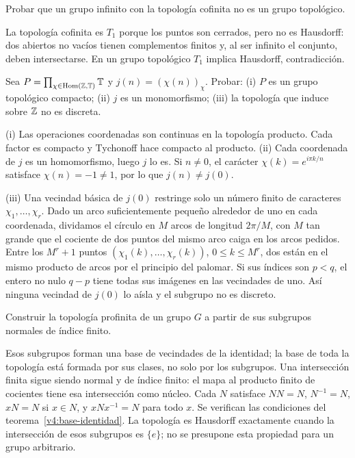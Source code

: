 \begin{ejercicio}\label{ej:v4-l15-2}
Probar que un grupo infinito con la topología cofinita no es un grupo topológico.
\end{ejercicio}
\begin{solucion}
La topología cofinita es $T_1$ porque los puntos son cerrados, pero no es Hausdorff: dos abiertos no vacíos tienen complementos finitos y, al ser infinito el conjunto, deben intersectarse. En un grupo topológico $T_1$ implica Hausdorff, contradicción.
\end{solucion}

\begin{ejercicio}\label{ej:v4-l15-3}
Sea $P=\prod_{\chi\in\operatorname{Hom}(\mathbb Z,\mathbb T)}\mathbb T$ y $j(n)=(\chi(n))_\chi$. Probar: (i) $P$ es un grupo topológico compacto; (ii) $j$ es un monomorfismo; (iii) la topología que induce sobre $\mathbb Z$ no es discreta.
\end{ejercicio}
\begin{solucion}
(i) Las operaciones coordenadas son continuas en la topología producto. Cada factor es compacto y Tychonoff hace compacto al producto. (ii) Cada coordenada de $j$ es un homomorfismo, luego $j$ lo es. Si $n\ne0$, el carácter $\chi(k)=e^{i\pi k/n}$ satisface $\chi(n)=-1\ne1$, por lo que $j(n)\ne j(0)$.

(iii) Una vecindad básica de $j(0)$ restringe solo un número finito de caracteres $\chi_1,\ldots,\chi_r$. Dado un arco suficientemente pequeño alrededor de uno en cada coordenada, dividamos el círculo en $M$ arcos de longitud $2\pi/M$, con $M$ tan grande que el cociente de dos puntos del mismo arco caiga en los arcos pedidos. Entre los $M^r+1$ puntos $(\chi_1(k),\ldots,\chi_r(k))$, $0\leq k\leq M^r$, dos están en el mismo producto de arcos por el principio del palomar. Si sus índices son $p<q$, el entero no nulo $q-p$ tiene todas sus imágenes en las vecindades de uno. Así ninguna vecindad de $j(0)$ lo aísla y el subgrupo no es discreto.
\end{solucion}

\begin{ejercicio}\label{ej:v4-l15-4}
Construir la topología profinita de un grupo $G$ a partir de sus subgrupos normales de índice finito.
\end{ejercicio}
\begin{solucion}
Esos subgrupos forman una base de vecindades de la identidad; la base de toda la topología está formada por sus clases, no solo por los subgrupos. Una intersección finita sigue siendo normal y de índice finito: el mapa al producto finito de cocientes tiene esa intersección como núcleo. Cada $N$ satisface $NN=N$, $N^{-1}=N$, $xN=N$ si $x\in N$, y $xNx^{-1}=N$ para todo $x$. Se verifican las condiciones del teorema~\ref{v4:base-identidad}. La topología es Hausdorff exactamente cuando la intersección de esos subgrupos es $\{e\}$; no se presupone esta propiedad para un grupo arbitrario.
\end{solucion}

